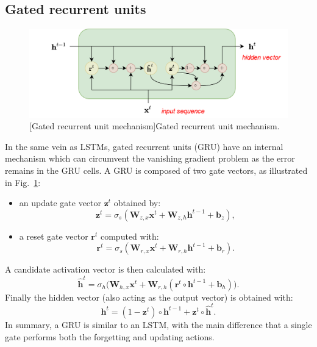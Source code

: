 \subsection{Gated recurrent units}

\begin{figure}[t]
    \begin{center}
    \includegraphics[width=0.9\linewidth]{Images/chap3/gru.png}
    [Gated recurrent unit mechanism]{Gated recurrent unit mechanism.}
    \label{fig:gru}
    \end{center}
\end{figure}

In the same vein as LSTMs, gated recurrent units (GRU) \cite{cho_learning_2014} have an internal mechanism which can circumvent the vanishing gradient problem as the error remains in the GRU cells. A GRU is composed of two gate vectors, as illustrated in Fig.~\ref{fig:gru}:
\begin{itemize}
    \item an update gate vector $\mathbf{z}^t$ obtained by:
    \begin{equation}
        \mathbf{z}^t = \sigma_s(\mathbf{W}_{z,x} \mathbf{x}^t + \mathbf{W}_{z,h} \mathbf{h}^{t-1} + \mathbf{b}_z),
    \end{equation}
    
    \item a reset gate vector $\mathbf{r}^t$ computed with:
    \begin{equation}
        \mathbf{r}^t = \sigma_s(\mathbf{W}_{r,x} \mathbf{x}^t + \mathbf{W}_{r,h} \mathbf{h}^{t-1} + \mathbf{b}_r).
    \end{equation}
\end{itemize}
A candidate activation vector is then calculated with:
\begin{equation}
    \mathbf{\hat{h}}^t = \sigma_h\big(\mathbf{W}_{h,x} \mathbf{x}^t + \mathbf{W}_{r,h} (\mathbf{r}^t \circ \mathbf{h}^{t-1} + \mathbf{b}_h)\big).
\end{equation}
Finally the hidden vector (also acting as the output vector) is obtained with:
\begin{equation}
    \mathbf{h}^t = (1-\mathbf{z}^t) \circ \mathbf{h}^{t-1} + \mathbf{z}^t \circ \mathbf{\hat{h}}^t.
\end{equation}
In summary, a GRU is similar to an LSTM, with the main difference that a single gate performs both the forgetting and updating actions.


